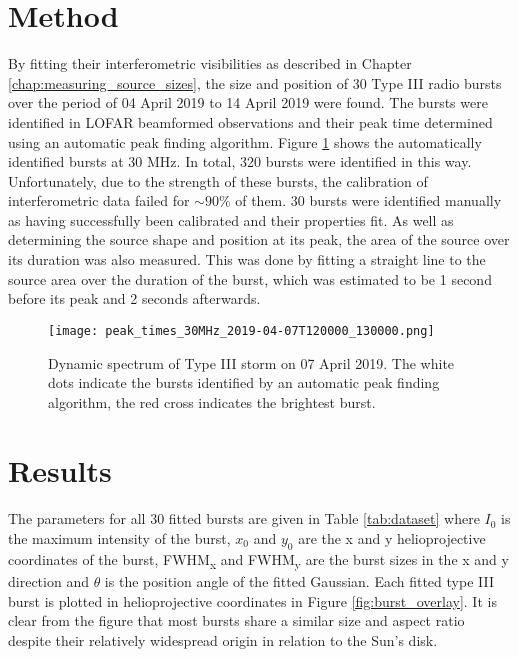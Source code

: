 \section{Method}
\label{sec:obsvtheory_method}
By fitting their interferometric visibilities as described in Chapter \ref{chap:measuring_source_sizes}, the size and position of 30 Type III radio bursts over the period of 04 April 2019 to 14 April 2019 were found. The bursts were identified in LOFAR beamformed observations and their peak time determined using an automatic peak finding algorithm. Figure \ref{fig:dynamic_spectrum_070419} shows the automatically identified bursts at 30 MHz. In total, 320 bursts were identified in this way. Unfortunately, due to the strength of these bursts, the calibration of interferometric data failed for $\sim 90 \%$ of them. 30 bursts were identified manually as having successfully been calibrated and their properties fit. As well as determining the source shape and position at its peak, the area of the source over its duration was also measured. This was done by fitting a straight line to the source area over the duration of the burst, which was estimated to be 1 second before its peak and 2 seconds afterwards.

\begin{figure}[ht]
\centering
\texttt{[image: peak\_times\_30MHz\_2019-04-07T120000\_130000.png]}
\caption[Dynamic spectrum of Type III storm on 07 April 2019.]{Dynamic spectrum of Type III storm on 07 April 2019. The white dots indicate the bursts identified by an automatic peak finding algorithm, the red cross indicates the brightest burst.}
\label{fig:dynamic_spectrum_070419}
\end{figure}

\section{Results}
\label{sec:obsvtheory_results}
The parameters for all 30 fitted bursts are given in Table \ref{tab:dataset} where $I_0$ is the maximum intensity of the burst, $x_0$ and $y_0$ are the x and y  helioprojective coordinates of the burst, FWHM\textsubscript{x} and FWHM\textsubscript{y} are the burst sizes in the x and y direction and $\theta$ is the position angle of the fitted Gaussian. Each fitted type III burst is plotted in helioprojective coordinates in Figure \ref{fig:burst_overlay}. It is clear from the figure that most bursts share a similar size and aspect ratio despite their relatively widespread origin in relation to the Sun's disk.

